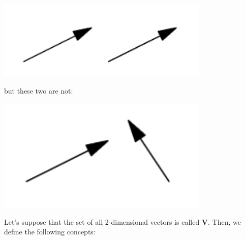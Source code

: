 \documentclass{article}
\begin{document}
\begin{center}
    \includegraphics[width=4in]{images/vector1.png}
\end{center}

but these two are not:
\begin{center}
    \includegraphics[width=4in]{images/vector2.png}
\end{center}

Let's suppose that the set of all 2-dimensional vectors is called $\mathbf{V}$. Then, we define the following concepts:
\end{document}
